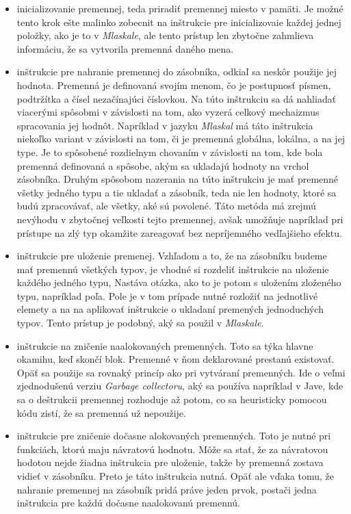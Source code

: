 \begin{itemize}
\item inicializovanie premennej, teda priradiť premennej miesto v pamäti. Je možné tento krok ešte malinko zobecnit na inštrukcie pre inicializovaie každej jednej položky, ako je to v \emph{Mlaskale}, ale tento prístup len zbytočne zahmlieva informáciu, že sa vytvorila premenná daného mena.
\item inštrukcie pre nahranie premennej do zásobníka, odkiaľ sa neskôr použije jej hodnota. Premenná je definovaná svojím menom, čo je postupnosť písmen, podtržítka a čísel nezačínajúci číslovkou. Na túto inštrukciu sa dá nahliadať viacerými spôsobmi v závislosti na tom, ako vyzerá celkový mechaizmus spracovania jej hodnôt. Napríklad v jazyku \emph{Mlaskal\cite{mlaskal}} má táto inštrukcia niekoľko variant v závislosti na tom, či je premenná globálna, lokálna, a na jej type. Je to spôsobené rozdielnym chovaním v závislosti na tom, kde bola premenná definovaná a spôsobe, akým sa ukladajú hodnoty na vrchol zásobníka. Druhým spôsobom nazerania na túto inštrukciu je mať premenné všetky jedného typu a tie ukladať a zásobník, teda nie len hodnoty, ktoré sa budú zpracovávať, ale všetky, aké sú povolené. Táto metóda má zrejmú nevýhodu v zbytočnej veľkosti tejto premennej, avšak umožňuje napríklad pri prístupe na zlý typ okamžite zareagovať bez nepríjemného vedľajšieho efektu.
\item inštrukcie pre uloženie premenej. Vzhľadom a to, že na zásobníku budeme mať premennú všetkých typov, je vhodné si rozdeliť inštrukcie na uloženie každého jedného typu, Nastáva otázka, ako to je potom s uložením zloženého typu, napríklad poľa. Pole je v tom prípade nutné rozložiť na jednotlivé elemety a na na aplikovať inštrukcie o ukladaní premených jednoduchých typov. Tento prístup je podobný, aký sa použil v \emph{Mlaskale}.
\item inštrukcie  na zničenie naalokovaných premenných. Toto sa týka hlavne okamihu, keď skončí blok. Premenné v ňom deklarované prestanú existovať. Opäť sa použije sa rovnaký princíp ako pri vytváraní premenných. Ide o veľmi zjednodušenú verziu \emph{Garbage collectoru\cite{vm}}, aký sa používa napríklad v Jave, kde sa o deštrukcii premennej rozhoduje až potom, co sa heuristicky pomocou kódu zistí, že sa premenná už nepoužije.
\item inštrukcie pre zničenie dočasne alokovaných premenných. Toto je nutné pri funkciách, ktorú maju návratovú hodnotu. Môže sa stať, že za návratovou hodotou nejde žiadna inštrukcia pre uloženie, takže by premenná zostava vidieť v zásobníku. Preto je táto inštrukcia nutná. Opäť ale vďaka tomu, že nahranie premennej na zásobník pridá práve jeden prvok, postači jedna inštrukcia pre každú dočasne naalokovanú premennú.

\end{itemize}
